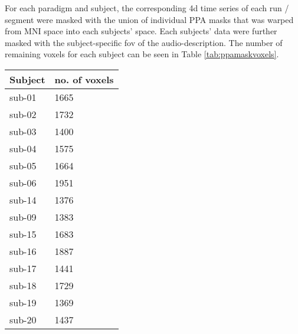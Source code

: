 







For each paradigm and subject, the corresponding 4d time series of each run /
segment were masked with the union of individual PPA masks
\citep[s.][]{haeusler2022processing} that was warped from MNI space into each
subjects' space.
Each subjects' data were further masked with the subject-specific \ac{fov} of
the audio-description.
%
The number of remaining voxels for each subject can be seen in Table
\ref{tab:ppamaskvoxels}.


\begin{table*}[btp]
    \caption{Number of remaining voxels after each subject's brain was masked
    with the union of individual \acp{ppa} that was warped from MNI space into
    each individual's subjects-space and a subject's-specific FoV from AO study.}

\label{tab:ppamaskvoxels}
\begin{tabular}{ll}
\toprule
\textbf{Subject} & \textbf{no. of voxels} \\
\midrule
sub-01 & 1665 \tabularnewline
sub-02 & 1732 \tabularnewline
sub-03 & 1400 \tabularnewline
sub-04 & 1575 \tabularnewline
sub-05 & 1664 \tabularnewline
sub-06 & 1951 \tabularnewline
sub-14 & 1376 \tabularnewline
sub-09 & 1383 \tabularnewline
sub-15 & 1683 \tabularnewline
sub-16 & 1887 \tabularnewline
sub-17 & 1441 \tabularnewline
sub-18 & 1729 \tabularnewline
sub-19 & 1369 \tabularnewline
sub-20 & 1437 \tabularnewline
\bottomrule
\end{tabular}
\end{table*}

